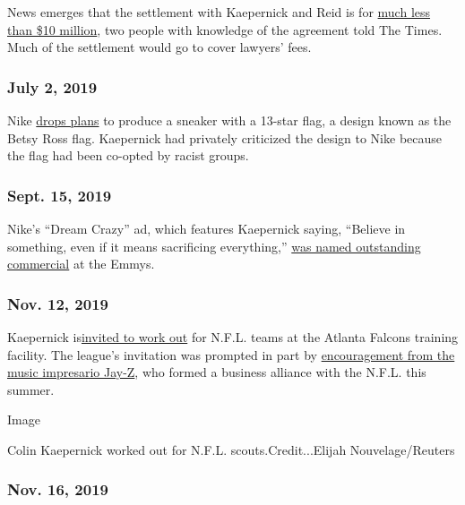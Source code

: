 News emerges that the settlement with Kaepernick and Reid is for
\href{https://www.nytimes.com/2019/03/21/sports/colin-kaepernick-nfl-settlement.html}{much
less than \$10 million}, two people with knowledge of the agreement told
The Times. Much of the settlement would go to cover lawyers' fees.

\hypertarget{july-2-2019}{%
\subsubsection{July 2, 2019}\label{july-2-2019}}

Nike
\href{https://www.nytimes.com/2019/07/02/business/betsy-ross-shoe-kaepernick-nike.html}{drops
plans} to produce a sneaker with a 13-star flag, a design known as the
Betsy Ross flag. Kaepernick had privately criticized the design to Nike
because the flag had been co-opted by racist groups.

\hypertarget{sept-15-2019}{%
\subsubsection{Sept. 15, 2019}\label{sept-15-2019}}

Nike's ``Dream Crazy'' ad, which features Kaepernick saying, ``Believe
in something, even if it means sacrificing everything,''
\href{https://www.nytimes.com/2019/09/16/sports/football/colin-kaepernick-nike-emmy.html}{was
named outstanding commercial} at the Emmys.

\hypertarget{nov-12-2019}{%
\subsubsection{Nov. 12, 2019}\label{nov-12-2019}}

Kaepernick
is\href{https://www.nytimes.com/2019/11/12/sports/football/colin-kaepernick-nfl-workout.html}{invited
to work out} for N.F.L. teams at the Atlanta Falcons training facility.
The league's invitation was prompted in part by
\href{https://www.nytimes.com/2019/11/15/sports/football/kaepernick-jay-z.html}{encouragement
from the music impresario Jay-Z}, who formed a business alliance with
the N.F.L. this summer.

Image

Colin Kaepernick worked out for N.F.L. scouts.Credit...Elijah
Nouvelage/Reuters

\hypertarget{nov-16-2019}{%
\subsubsection{Nov. 16, 2019}\label{nov-16-2019}}

